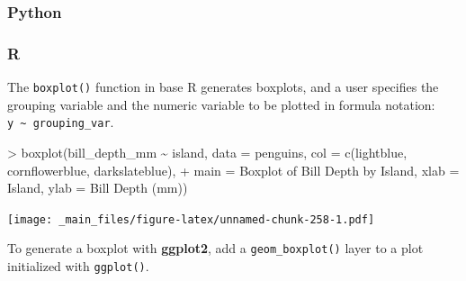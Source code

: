 \documentclass[
]{book}
\newenvironment{Shaded}{\begin{snugshade}}{\end{snugshade}}
\newcommand{\AttributeTok}[1]{\textcolor[rgb]{0.77,0.63,0.00}{#1}}
\newcommand{\FunctionTok}[1]{\textcolor[rgb]{0.00,0.00,0.00}{#1}}
\newcommand{\NormalTok}[1]{#1}
\newcommand{\SpecialCharTok}[1]{\textcolor[rgb]{0.00,0.00,0.00}{#1}}
\newcommand{\StringTok}[1]{\textcolor[rgb]{0.31,0.60,0.02}{#1}}
\begin{document}
\hypertarget{python-43}{%
\subsubsection*{Python}\label{python-43}}

\hypertarget{r-43}{%
\subsubsection*{R}\label{r-43}}

The \texttt{boxplot()} function in base R generates boxplots, and a user specifies the grouping variable and the numeric variable to be plotted in formula notation: \texttt{y\ \textasciitilde{}\ grouping\_var}.

\begin{Shaded}
\begin{Highlighting}[]
\SpecialCharTok{\textgreater{}} \FunctionTok{boxplot}\NormalTok{(bill\_depth\_mm }\SpecialCharTok{\textasciitilde{}}\NormalTok{ island, }\AttributeTok{data =}\NormalTok{ penguins, }\AttributeTok{col =} \FunctionTok{c}\NormalTok{(}\StringTok{\textquotesingle{}lightblue\textquotesingle{}}\NormalTok{, }\StringTok{\textquotesingle{}cornflowerblue\textquotesingle{}}\NormalTok{, }\StringTok{\textquotesingle{}darkslateblue\textquotesingle{}}\NormalTok{),}
\SpecialCharTok{+}         \AttributeTok{main =} \StringTok{\textquotesingle{}Boxplot of Bill Depth by Island\textquotesingle{}}\NormalTok{, }\AttributeTok{xlab =} \StringTok{\textquotesingle{}Island\textquotesingle{}}\NormalTok{, }\AttributeTok{ylab =} \StringTok{\textquotesingle{}Bill Depth (mm)\textquotesingle{}}\NormalTok{)}
\end{Highlighting}
\end{Shaded}

\texttt{[image: \_main\_files/figure-latex/unnamed-chunk-258-1.pdf]}

To generate a boxplot with \textbf{ggplot2}, add a \texttt{geom\_boxplot()} layer to a plot initialized with \texttt{ggplot()}.
\end{document}
